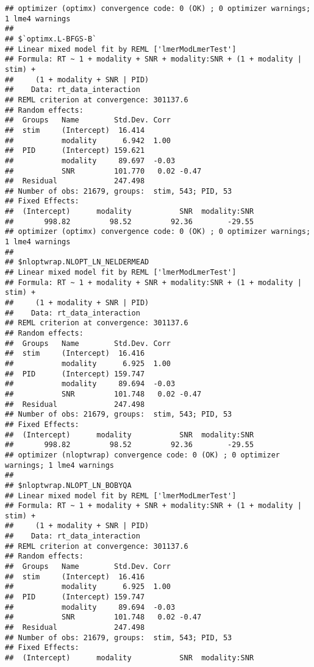 \documentclass[
]{article}
\begin{document}
\begin{verbatim}
## optimizer (optimx) convergence code: 0 (OK) ; 0 optimizer warnings; 1 lme4 warnings 
## 
## $`optimx.L-BFGS-B`
## Linear mixed model fit by REML ['lmerModLmerTest']
## Formula: RT ~ 1 + modality + SNR + modality:SNR + (1 + modality | stim) +  
##     (1 + modality + SNR | PID)
##    Data: rt_data_interaction
## REML criterion at convergence: 301137.6
## Random effects:
##  Groups   Name        Std.Dev. Corr       
##  stim     (Intercept)  16.414             
##           modality      6.942  1.00       
##  PID      (Intercept) 159.621             
##           modality     89.697  -0.03      
##           SNR         101.770   0.02 -0.47
##  Residual             247.498             
## Number of obs: 21679, groups:  stim, 543; PID, 53
## Fixed Effects:
##  (Intercept)      modality           SNR  modality:SNR  
##       998.82         98.52         92.36        -29.55  
## optimizer (optimx) convergence code: 0 (OK) ; 0 optimizer warnings; 1 lme4 warnings 
## 
## $nloptwrap.NLOPT_LN_NELDERMEAD
## Linear mixed model fit by REML ['lmerModLmerTest']
## Formula: RT ~ 1 + modality + SNR + modality:SNR + (1 + modality | stim) +  
##     (1 + modality + SNR | PID)
##    Data: rt_data_interaction
## REML criterion at convergence: 301137.6
## Random effects:
##  Groups   Name        Std.Dev. Corr       
##  stim     (Intercept)  16.416             
##           modality      6.925  1.00       
##  PID      (Intercept) 159.747             
##           modality     89.694  -0.03      
##           SNR         101.748   0.02 -0.47
##  Residual             247.498             
## Number of obs: 21679, groups:  stim, 543; PID, 53
## Fixed Effects:
##  (Intercept)      modality           SNR  modality:SNR  
##       998.82         98.52         92.36        -29.55  
## optimizer (nloptwrap) convergence code: 0 (OK) ; 0 optimizer warnings; 1 lme4 warnings 
## 
## $nloptwrap.NLOPT_LN_BOBYQA
## Linear mixed model fit by REML ['lmerModLmerTest']
## Formula: RT ~ 1 + modality + SNR + modality:SNR + (1 + modality | stim) +  
##     (1 + modality + SNR | PID)
##    Data: rt_data_interaction
## REML criterion at convergence: 301137.6
## Random effects:
##  Groups   Name        Std.Dev. Corr       
##  stim     (Intercept)  16.416             
##           modality      6.925  1.00       
##  PID      (Intercept) 159.747             
##           modality     89.694  -0.03      
##           SNR         101.748   0.02 -0.47
##  Residual             247.498             
## Number of obs: 21679, groups:  stim, 543; PID, 53
## Fixed Effects:
##  (Intercept)      modality           SNR  modality:SNR  

\end{verbatim}
\end{document}
